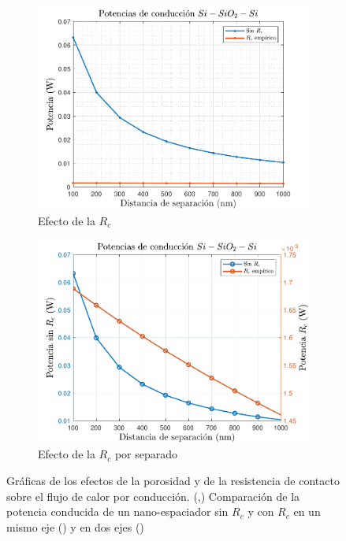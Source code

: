 \begin{figure}[H]
	\centering
	\begin{subfigure}[b]{0.49\textwidth}
		\centering
		\includegraphics[width=1.0\textwidth]{figuras/Resultados/conduccion/pdf/Prc_SiSiO2Si.pdf}
		\caption{Efecto de la $R_c$}
		\label{fig:Prc_SiSiO2Si}
	\end{subfigure}
	\hfill
	\begin{subfigure}[b]{0.49\textwidth}
		\centering
		\includegraphics[width=1.0\textwidth]{figuras/Resultados/conduccion/pdf/Prc2_SiSiO2Si.pdf}
		\caption{Efecto de la $R_c$ por separado}
		\label{fig:Prc2_SiSiO2Si}
	\end{subfigure}
	\caption[Efectos de la resistencia de contacto sobre el flujo de calor por conducción]{Gráficas de los efectos de la porosidad y de la resistencia de contacto sobre el flujo de calor por conducción. (,) Comparación de la potencia conducida de un nano-espaciador sin $R_c$ y con $R_c$ en un mismo eje () y en dos ejes ()}
	\label{fig:PcondRc_SiSiO2Si}
\end{figure}
